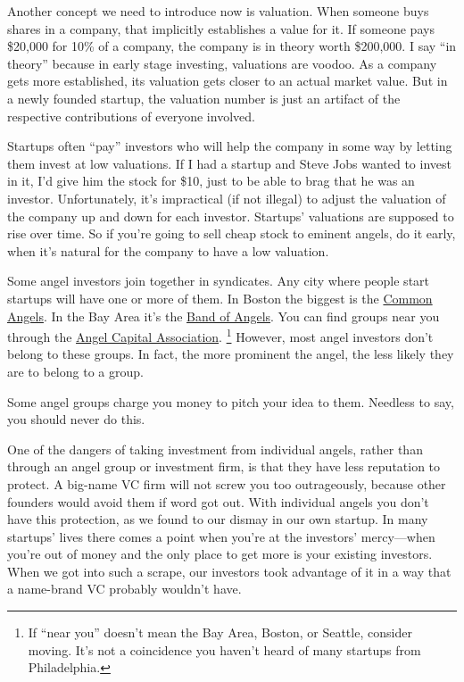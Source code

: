 Another concept we need to introduce now is valuation. When someone buys
shares in a company, that implicitly establishes a value for it. If
someone pays \$20,000 for 10\% of a company, the company is in theory
worth \$200,000. I say ``in theory'' because in early stage investing,
valuations are voodoo. As a company gets more established, its valuation
gets closer to an actual market value. But in a newly founded startup,
the valuation number is just an artifact of the respective contributions
of everyone involved.

Startups often ``pay'' investors who will help the company in some way
by letting them invest at low valuations. If I had a startup and Steve
Jobs wanted to invest in it, I'd give him the stock for \$10, just to be
able to brag that he was an investor. Unfortunately, it's impractical
(if not illegal) to adjust the valuation of the company up and down for
each investor. Startups' valuations are supposed to rise over time. So
if you're going to sell cheap stock to eminent angels, do it early, when
it's natural for the company to have a low valuation.

Some angel investors join together in syndicates. Any city where people
start startups will have one or more of them. In Boston the biggest is
the \href{http://commonangels.com/home.html}{Common Angels}. In the Bay
Area it's the \href{http://bandangels.com/}{Band of Angels}. You can
find groups near you through the
\href{http://angelcapitalassociation.org/}{Angel Capital Association}.
\footnote{If ``near you'' doesn't mean the Bay Area, Boston, or Seattle,
consider moving. It's not a coincidence you haven't heard of many
startups from Philadelphia.} However, most angel investors don't belong to
these groups. In fact, the more prominent the angel, the less likely
they are to belong to a group.

Some angel groups charge you money to pitch your idea to them. Needless
to say, you should never do this.

One of the dangers of taking investment from individual angels, rather
than through an angel group or investment firm, is that they have less
reputation to protect. A big-name VC firm will not screw you too
outrageously, because other founders would avoid them if word got out.
With individual angels you don't have this protection, as we found to
our dismay in our own startup. In many startups' lives there comes a
point when you're at the investors' mercy---when you're out of money and
the only place to get more is your existing investors. When we got into
such a scrape, our investors took advantage of it in a way that a
name-brand VC probably wouldn't have.

